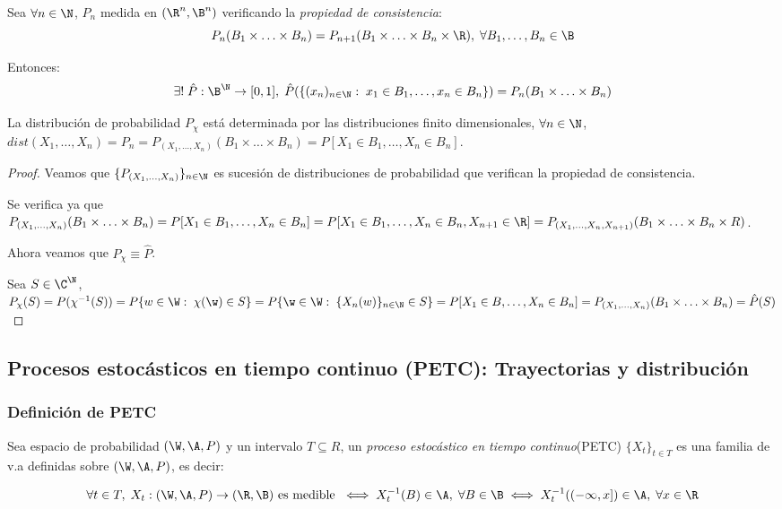 \begin{nth}
  Sea $\forall n \in \N$, $P_n$ medida en $(\R^n, \B^n)$ verificando la \emph{propiedad de consistencia}: $$ P_n(B_1 \times \ldots \times B_n) = P_{n+1}(B_1 \times \ldots \times B_n \times \R), \; \forall B_1, \ldots, B_n \in \B $$

  Entonces:
  $$\exists! \; \hat{P} : \B^\N \to [0,1], \;\hat{P}(\{(x_n)_{n \in \N} : \; x_1 \in B_1, \ldots, x_n \in B_n \}) = P_n(B_1 \times \ldots \times B_n)$$
\end{nth}

\begin{ncor}
  La distribución de probabilidad $P_\chi$ está determinada por las distribuciones finito dimensionales, $\forall n \in \N$, $dist(X_1, \ldots, X_n) = P_n = P_{(X_1, \ldots, X_n)}(B_1 \times \ldots \times B_n) = P[X_1 \in B_1, \ldots, X_n \in B_n]$.
\end{ncor}

\begin{proof}
  Veamos que $\{P_{(X_1, \ldots, X_n)}\}_{n \in \N}$ es sucesión de distribuciones de probabilidad que verifican la propiedad de consistencia.

  Se verifica ya que $P_{(X_1, \ldots, X_n)}(B_1 \times \ldots \times B_n) = P[X_1 \in B_1, \ldots, X_n \in B_n] = P[X_1 \in B_1, \ldots, X_n \in B_n, X_{n+1} \in \R] = P_{(X_1, \ldots, X_n, X_{n+1})}(B_1 \times \ldots \times B_n \times R)$.

  Ahora veamos que $P_\chi \equiv \hat{P}$.

  Sea $S \in \C^\N$, $P_\chi(S) = P(\chi^{-1}(S)) = P\{w \in \W : \; \chi(\w) \in S\} = P \{\w \in \W : \; \{X_n(w)\}_{n \in \N} \in S\} = P[X_1 \in B, \ldots, X_n \in B_n] = P_{(X_1, \ldots, X_n)}(B_1 \times \ldots \times B_n) = \hat{P}(S)$
\end{proof}

\subsection{Procesos estocásticos en tiempo continuo (PETC): Trayectorias y distribución}

\subsubsection{Definición de PETC}

\begin{ndef}
  Sea espacio de probabilidad $(\W, \A, P)$ y un intervalo $T \subseteq R$, un \emph{proceso estocástico en tiempo continuo}(PETC) $\{X_t\}_{t \in T}$ es una familia de v.a definidas sobre $(\W, \A, P)$, es decir:

  \begin{equation}
    \forall t \in T, \; X_t : (\W, \A, P) \to (\R, \B) \text{ es medible }
    \iff X^{-1}_t(B) \in \A, \; \forall B \in \B \iff X_t^{-1}((-\infty, x]) \in \A, \; \forall x \in \R
  \end{equation}
\end{ndef}

